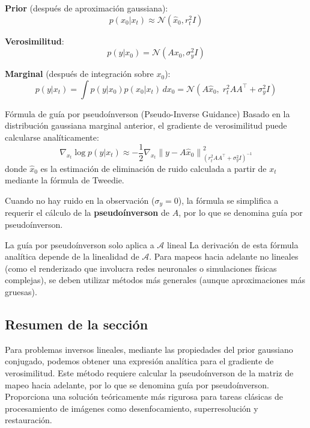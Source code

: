 \textbf{Prior} (después de aproximación gaussiana):
$$
p(x_0 | x_t) \approx \mathcal{N}(\hat{x}_0, r_t^2 I)
$$

\textbf{Verosimilitud}:
$$
p(y | x_0) = \mathcal{N}(A x_0, \sigma_y^2 I)
$$

\textbf{Marginal} (después de integración sobre $x_0$):
$$
p(y | x_t) = \int p(y | x_0) p(x_0 | x_t) \, dx_0 = \mathcal{N}(A \hat{x}_0, \; r_t^2 A A^\top + \sigma_y^2 I)
$$

\begin{importantbox}{Fórmula de guía por pseudoínverson (Pseudo-Inverse Guidance)}
Basado en la distribución gaussiana marginal anterior, el gradiente de verosimilitud puede calcularse analíticamente:
$$
\nabla_{x_t} \log p(y | x_t) \approx -\frac{1}{2} \nabla_{x_t} \left\| y - A \hat{x}_0 \right\|^2_{(r_t^2 A A^\top + \sigma_y^2 I)^{-1}}
$$
donde $\hat{x}_0$ es la estimación de eliminación de ruido calculada a partir de $x_t$ mediante la fórmula de Tweedie.

Cuando no hay ruido en la observación ($\sigma_y = 0$), la fórmula se simplifica a requerir el cálculo de la \textbf{pseudoínverson} de $A$, por lo que se denomina guía por pseudoínverson.
\end{importantbox}

\begin{warningbox}{La guía por pseudoínverson solo aplica a $\mathcal{A}$ lineal}
La derivación de esta fórmula analítica depende de la linealidad de $\mathcal{A}$. Para mapeos hacia adelante no lineales (como el renderizado que involucra redes neuronales o simulaciones físicas complejas), se deben utilizar métodos más generales (aunque aproximaciones más gruesas).
\end{warningbox}

\subsection{Resumen de la sección}

Para problemas inversos lineales, mediante las propiedades del prior gaussiano conjugado, podemos obtener una expresión analítica para el gradiente de verosimilitud. Este método requiere calcular la pseudoínverson de la matriz de mapeo hacia adelante, por lo que se denomina guía por pseudoínverson. Proporciona una solución teóricamente más rigurosa para tareas clásicas de procesamiento de imágenes como desenfocamiento, superresolución y restauración.
